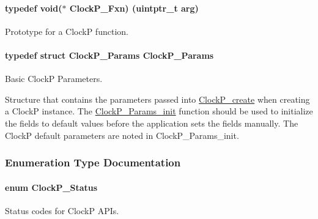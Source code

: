 \paragraph[{Clock\+P\+\_\+\+Fxn}]{\setlength{\rightskip}{0pt plus 5cm}typedef void($\ast$ Clock\+P\+\_\+\+Fxn) (uintptr\+\_\+t arg)}\label{_clock_p_8h_af516e3c763bec8fb9769ecc4ac7296bb}


Prototype for a Clock\+P function. 

\paragraph[{Clock\+P\+\_\+\+Params}]{\setlength{\rightskip}{0pt plus 5cm}typedef struct {\bf Clock\+P\+\_\+\+Params}  {\bf Clock\+P\+\_\+\+Params}}\label{_clock_p_8h_a5c7625ee9fd43a5753a76382f81ca0eb}


Basic Clock\+P Parameters. 

Structure that contains the parameters passed into \hyperlink{_clock_p_8h_a1eab19790e2a9a2ed41fb4d900a3e12e}{Clock\+P\+\_\+create} when creating a Clock\+P instance. The \hyperlink{_clock_p_8h_a666e9ded465c969456e6c4ef95e849f4}{Clock\+P\+\_\+\+Params\+\_\+init} function should be used to initialize the fields to default values before the application sets the fields manually. The Clock\+P default parameters are noted in Clock\+P\+\_\+\+Params\+\_\+init. 

\subsubsection{Enumeration Type Documentation}
\paragraph[{Clock\+P\+\_\+\+Status}]{\setlength{\rightskip}{0pt plus 5cm}enum {\bf Clock\+P\+\_\+\+Status}}\label{_clock_p_8h_aa2030f172fe0c2dbc9ac0b082933c767}


Status codes for Clock\+P A\+P\+Is. 

